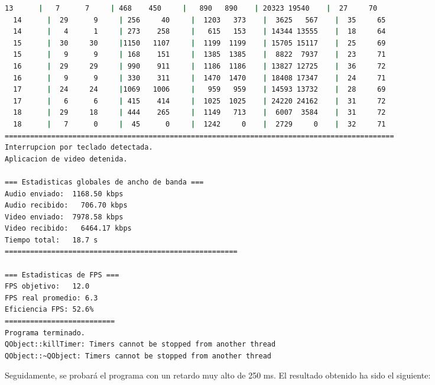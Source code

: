 \begin{adjustbox}{max width=\textwidth}
\begin{lstlisting}[language=bash,basicstyle=\ttfamily\scriptsize]
  13      |   7      7     | 468    450     |   890   890    | 20323 19540    |  27     70
  14      |  29      9     | 256     40     |  1203   373    |  3625   567    |  35     65
  14      |   4      1     | 273    258     |   615   153    | 14344 13555    |  18     64
  15      |  30     30     |1150   1107     |  1199  1199    | 15705 15117    |  25     69
  15      |   9      9     | 168    151     |  1385  1385    |  8822  7937    |  23     71
  16      |  29     29     | 990    911     |  1186  1186    | 13827 12725    |  36     72
  16      |   9      9     | 330    311     |  1470  1470    | 18408 17347    |  24     71
  17      |  24     24     |1069   1006     |   959   959    | 14593 13732    |  28     69
  17      |   6      6     | 415    414     |  1025  1025    | 24220 24162    |  31     72
  18      |  29     18     | 444    265     |  1149   713    |  6007  3584    |  31     72
  18      |   7      0     |  45      0     |  1242     0    |  2729     0    |  32     71
============================================================================================
Interrupcion por teclado detectada.
Aplicacion de video detenida.

=== Estadisticas globales de ancho de banda ===
Audio enviado:	1168.50 kbps
Audio recibido:   706.70 kbps
Video enviado:	7978.58 kbps
Video recibido:   6464.17 kbps
Tiempo total: 	18.7 s
=======================================================

=== Estadisticas de FPS ===
FPS objetivo: 	12.0
FPS real promedio: 6.3
Eficiencia FPS:	52.6%
==========================
Programa terminado.
QObject::killTimer: Timers cannot be stopped from another thread
QObject::~QObject: Timers cannot be stopped from another thread
\end{lstlisting}
\end{adjustbox}
\vspace{\baselineskip}

\newpage

Seguidamente, se probará el programa con un retardo muy alto de 250 ms. El resultado obtenido ha sido el siguiente:
\vspace{\baselineskip}

